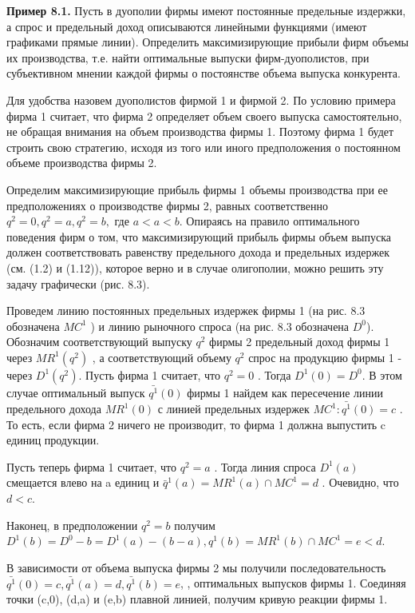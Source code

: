 \documentclass[12pt, 4paper]{book}
\begin{document}
{\textbf{Пример 8.1.} Пусть в дуополии фирмы имеют постоянные предельные издержки, а спрос и предельный доход описываются линейными функциями (имеют графиками прямые линии). Определить максимизирующие прибыли фирм объемы их производства, т.е. найти оптимальные выпуски фирм-дуополистов, при субъективном мнении каждой фирмы о постоянстве объема выпуска конкурента.
\par

Для удобства назовем дуополистов фирмой 1 и фирмой 2. По условию примера фирма 1 считает, что фирма 2 определяет объем своего выпуска самостоятельно, не обращая внимания на объем производства фирмы 1. Поэтому фирма 1 будет строить свою стратегию, исходя из того или иного предположения о постоянном объеме производства фирмы 2.
\par

Определим максимизирующие прибыль фирмы 1 объемы производства при ее предположениях о производстве фирмы 2, равных соответственно $q^2 = 0,q^2 = a ,q^2 = b,$ где $a < a < b$. Опираясь на правило оптимального поведения фирм о том, что максимизирующий прибыль фирмы объем выпуска должен соответствовать равенству предельного дохода и предельных издержек (см. (1.2) и (1.12)), которое верно и в случае олигополии, можно решить эту задачу графически (рис. 8.3).
\par

Проведем линию постоянных предельных издержек фирмы 1 (на рис. 8.3 обозначена $MC^1$ ) и линию рыночного спроса (на рис. 8.3 обозначена $D^0$). Обозначим соответствующий выпуску $q^2$ фирмы 2 предельный доход фирмы 1 через $MR^1(q^2)$ , а соответствующий объему $q^2$ спрос на продукцию фирмы 1 - через $D^{1}(q^2)$. 
 Пусть фирма 1 считает, что $q^2 = 0$ . Тогда $D^1(0)=D^0$. В этом случае оптимальный выпуск $\bar{q^1}(0)$ фирмы 1 найдем как пересечение линии предельного дохода $MR^1(0)$ с линией предельных издержек $MC^1 : \bar{q^1}(0) = c$ . То есть, если фирма 2 ничего не производит, то фирма 1 должна выпустить c единиц продукции. 
\par

 Пусть теперь фирма 1 считает, что $q^2=a$ . Тогда линия спроса $D^1(a)$ смещается влево на a единиц и $\bar{q}^1(a)=MR^1(a) \cap MC^1 = d$ . Очевидно, что $d<c$.
\par

Наконец, в предположении $q^2=b$ получим $D^1(b)=D^0-b=D^1(a)-(b-a), q^1(b)=MR^1(b)\cap MC^1 = e <d.$
\par

В зависимости от объема выпуска фирмы 2 мы получили последовательность $\bar{q^1}(0)=c,\bar{q^1}(a)=d,\bar{q^1}(b)=e$, ,  оптимальных выпусков фирмы 1. Соединяя точки (c,0), (d,a)  и (e,b) плавной линией, получим кривую реакции фирмы 1.
\par

}
\end{document}
